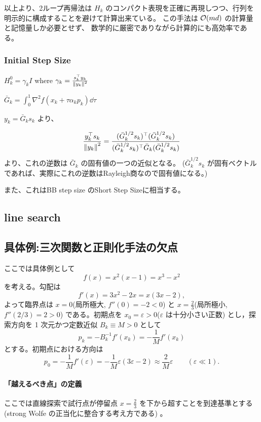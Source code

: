 \documentclass[a4paper, 10pt, dvipdfmx,draft]{article}
\begin{document}
以上より、2ループ再帰法は $H_k$ のコンパクト表現を正確に再現しつつ、行列を明示的に構成することを避けて計算出来ている。
この手法は $\order{md}$ の計算量と記憶量しか必要とせず、
数学的に厳密でありながら計算的にも高効率である。


\subsubsection{Initial Step Size}

$H_k^{0} = \gamma_k I$ where $\gamma_k = \frac{s_k^\top y_k}{\norm{y_k}^2}$
\cite{liuLimitedMemoryBFGS1989a,shannoMatrixConditioningNonlinear1978}

$\bar{G}_k=\int_0^1 \nabla^2 f(x_k + \tau \alpha_k p_k) \dd \tau$

$y_k = \bar{G}_k s_k$ より、

\begin{equation*}
    \frac{y_k^\top s_k}{\norm{y_k}^2} = \frac{(\bar{G}_k^{1/2} s_k)^\top (\bar{G}_k^{1/2} s_k)}{(\bar{G}_k^{1/2} s_k)^\top \bar{G}_k (\bar{G}_k^{1/2} s_k)}
\end{equation*}
より、これの逆数は $\bar{G}_k$ の固有値の一つの近似となる。
($\bar{G}_k^{1/2} s_k$ が固有ベクトルであれば、実際にこれの逆数はRayleigh商なので固有値になる。)

また、これはBB step size \cite{barzilaiTwoPointStepSize1988}のShort Step Sizeに相当する。

\subsection{line search}

\subsection*{具体例:三次関数と正則化手法の欠点}

ここでは具体例として
\[
    f(x)=x^2(x-1)=x^3-x^2
\]
を考える。勾配は
\[
    f'(x)=3x^2-2x = x(3x-2),
\]
よって臨界点は $x=0$(局所極大, $f''(0)=-2<0$) と $x=\frac{2}{3}$(局所極小, $f''(2/3)=2>0$) である。初期点を $x_0=\varepsilon>0$($\varepsilon$ は十分小さい正数) とし，探索方向を 1 次元かつ定数近似 $B_k\equiv M>0$ として
\[
    p_k=-B_k^{-1}f'(x_k)=-\frac{1}{M}f'(x_k)
\]
とする。初期点における方向は
\[
    p_0 = -\frac{1}{M}f'(\varepsilon) = -\frac{1}{M}\varepsilon(3\varepsilon-2)\approx \frac{2}{M}\varepsilon\qquad(\varepsilon\ll1).
\]

\paragraph{「越えるべき点」の定義}
ここでは直線探索で試行点が停留点 $x=\frac{2}{3}$ を下から超すことを到達基準とする(strong Wolfe の正当化に整合する考え方である) 。
\end{document}
